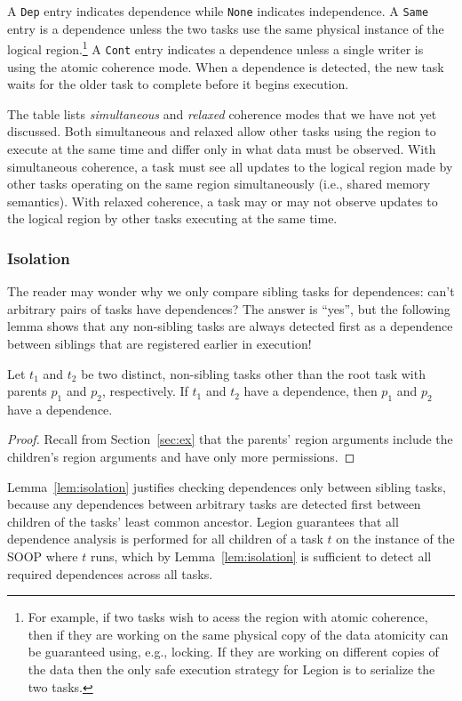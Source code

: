 A {\tt Dep} entry indicates dependence while {\tt None}
indicates independence.  A {\tt Same} entry is a dependence unless the two tasks
use the same physical instance of the logical region.\footnote{For example, if two tasks wish to acess the region with atomic coherence, then if they are working on the same physical copy of the data atomicity can be guaranteed using, e.g., locking.  If they are working on different copies of the data then the only safe execution strategy for Legion is to serialize the two tasks.}
A {\tt Cont} entry
indicates a dependence unless a single writer is using the
atomic coherence mode.  When a dependence is detected, the new task
waits for the older task to complete before it begins execution.

The table lists {\em simultaneous} and {\em relaxed} coherence modes
that we have not yet discussed.  Both simultaneous and relaxed
allow other tasks using the region to execute at the same time and differ
only in what data must be observed.  With simultaneous coherence, a task must 
see all updates to the logical region made by other tasks operating on the same region 
simultaneously (i.e., shared memory semantics).  With relaxed coherence, 
a task may or may not observe updates to the logical region by other tasks executing at
the same time.


\subsubsection{Isolation}
The reader may wonder why we only compare sibling tasks for
dependences: can't arbitrary pairs of tasks have dependences?  The
answer is ``yes'', but the following lemma shows that
any non-sibling tasks are always detected first as a dependence between
siblings that are registered earlier in execution!
\begin{lemma}
\label{lem:isolation}
\rm
Let $t_1$ and $t_2$ be two distinct, non-sibling tasks other than the root task with parents $p_1$ and $p_2$, respectively.
If $t_1$ and $t_2$ have a dependence, then $p_1$ and $p_2$ have a dependence.
\end{lemma}
\begin{proof}
Recall from Section~\ref{sec:ex} that the parents' region arguments include the children's region arguments and have
only more permissions.
\end{proof}
Lemma~\ref{lem:isolation} justifies checking dependences only between sibling tasks, because any dependences between 
arbitrary tasks are detected first between children of the tasks' least common ancestor.  Legion
guarantees that all dependence analysis is performed for all children of a task $t$ on the instance of the SOOP where $t$
runs, which by Lemma~\ref{lem:isolation} is sufficient to detect all required dependences across all tasks.

